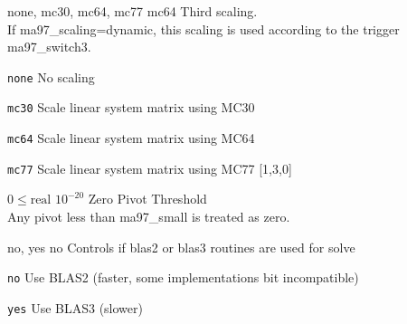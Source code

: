 %
{\ttfamily none, mc30, mc64, mc77}%
{mc64}%
{Third scaling.\\
If ma97\_scaling=dynamic, this scaling is used according to the trigger ma97\_switch3.}%
{\begin{list}{}{
\setlength{\parsep}{0em}
\setlength{\leftmargin}{5ex}
\setlength{\labelwidth}{2ex}
\setlength{\itemindent}{0ex}
\setlength{\topsep}{0pt}}
\item[\texttt{none}] No scaling
\item[\texttt{mc30}] Scale linear system matrix using MC30
\item[\texttt{mc64}] Scale linear system matrix using MC64
\item[\texttt{mc77}] Scale linear system matrix using MC77 [1,3,0]
\end{list}
}

%
{$0\leq\textrm{real}$}%
{$10^{-20}$}%
{Zero Pivot Threshold\\
Any pivot less than ma97\_small is treated as zero.}%
{}

%
{\ttfamily no, yes}%
{no}%
{Controls if blas2 or blas3 routines are used for solve}%
{\begin{list}{}{
\setlength{\parsep}{0em}
\setlength{\leftmargin}{5ex}
\setlength{\labelwidth}{2ex}
\setlength{\itemindent}{0ex}
\setlength{\topsep}{0pt}}
\item[\texttt{no}] Use BLAS2 (faster, some implementations bit incompatible)
\item[\texttt{yes}] Use BLAS3 (slower)
\end{list}
}

